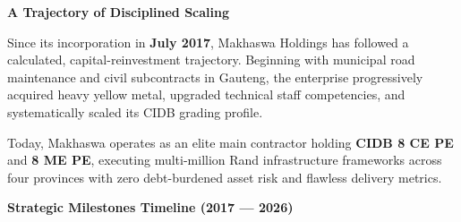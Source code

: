 \hypertarget{sec:journey}{}

\noindent
\begin{minipage}[t]{0.62\textwidth}
    {\large\bfseries\color{mhnavy} A Trajectory of Disciplined Scaling}
    \vspace{0.12cm}

    {\fontsize{9.0pt}{13.0pt}\selectfont\color{mhtext}
    Since its incorporation in \textbf{July 2017}, Makhaswa Holdings has followed a calculated, capital-reinvestment trajectory. Beginning with municipal road maintenance and civil subcontracts in Gauteng, the enterprise progressively acquired heavy yellow metal, upgraded technical staff competencies, and systematically scaled its CIDB grading profile.
    }

    \vspace{0.20cm}

    {\fontsize{9.0pt}{13.0pt}\selectfont\color{mhtext}
    Today, Makhaswa operates as an elite main contractor holding \textbf{CIDB 8 CE PE} and \textbf{8 ME PE}, executing multi-million Rand infrastructure frameworks across four provinces with zero debt-burdened asset risk and flawless delivery metrics.
    }
\end{minipage}
\hfill
\begin{minipage}[t]{0.34\textwidth}
    \vspace{0.20cm}
\end{minipage}

\vfill

{\large\bfseries\color{mhnavy} Strategic Milestones Timeline (2017 --- 2026)}
\vspace{0.10cm}

